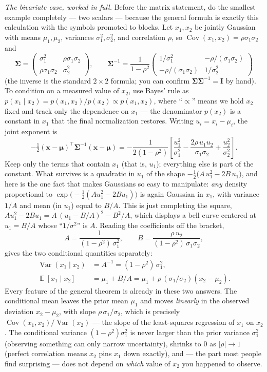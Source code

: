 \documentclass[11pt]{article}
\numberwithin{equation}{section}
\theoremstyle{plain}
\theoremstyle{definition}
\theoremstyle{remark}
\DeclareMathOperator{\E}{\mathbb{E}}
\DeclareMathOperator{\Var}{Var}
\DeclareMathOperator{\Cov}{Cov}
\newcommand{\x}{\bm{x}}
\newcommand{\bmu}{\bm{\mu}}
\newcommand{\bSigma}{\bm{\Sigma}}
\newcommand{\T}{\top}
\begin{document}
\emph{The bivariate case, worked in full.} Before the matrix statement, do the smallest example completely --- two scalars --- because the general formula is exactly this calculation with the symbols promoted to blocks. Let $x_1, x_2$ be jointly Gaussian with means $\mu_1, \mu_2$, variances $\sigma_1^2, \sigma_2^2$, and correlation $\rho$, so $\Cov(x_1, x_2) = \rho\sigma_1\sigma_2$ and
\[
\bSigma = \begin{pmatrix} \sigma_1^2 & \rho\sigma_1\sigma_2 \\ \rho\sigma_1\sigma_2 & \sigma_2^2 \end{pmatrix},
\qquad
\bSigma^{-1} = \frac{1}{1-\rho^2}\begin{pmatrix} 1/\sigma_1^2 & -\rho/(\sigma_1\sigma_2) \\ -\rho/(\sigma_1\sigma_2) & 1/\sigma_2^2 \end{pmatrix}
\]
(the inverse is the standard $2\times 2$ formula; you can confirm $\bSigma\bSigma^{-1} = \bm{I}$ by hand). To condition on a measured value of $x_2$, use Bayes' rule as $p(x_1 \mid x_2) = p(x_1, x_2)/p(x_2) \propto p(x_1, x_2)$, where ``$\propto$'' means we hold $x_2$ fixed and track only the dependence on $x_1$ --- the denominator $p(x_2)$ is a constant in $x_1$ that the final normalization restores. Writing $u_i = x_i - \mu_i$, the joint exponent is
\[
-\tfrac12 (\x - \bmu)^\T \bSigma^{-1} (\x - \bmu)
= -\frac{1}{2(1-\rho^2)}\left[ \frac{u_1^2}{\sigma_1^2} - \frac{2\rho\, u_1 u_2}{\sigma_1\sigma_2} + \frac{u_2^2}{\sigma_2^2} \right].
\]
Keep only the terms that contain $x_1$ (that is, $u_1$); everything else is part of the constant. What survives is a quadratic in $u_1$ of the shape $-\tfrac12\big(A\,u_1^2 - 2B\,u_1\big)$, and here is the one fact that makes Gaussians so easy to manipulate: \emph{any} density proportional to $\exp\!\big(\!-\tfrac12(A u_1^2 - 2B u_1)\big)$ is again Gaussian in $x_1$, with variance $1/A$ and mean (in $u_1$) equal to $B/A$. This is just completing the square, $A u_1^2 - 2B u_1 = A\,(u_1 - B/A)^2 - B^2/A$, which displays a bell curve centered at $u_1 = B/A$ whose ``$1/\sigma^2$'' is $A$. Reading the coefficients off the bracket,
\[
A = \frac{1}{(1-\rho^2)\,\sigma_1^2}, \qquad
B = \frac{\rho\, u_2}{(1-\rho^2)\,\sigma_1\sigma_2},
\]
gives the two conditional quantities separately:
\begin{align*}
\Var(x_1 \mid x_2)
&= A^{-1}
= (1-\rho^2)\,\sigma_1^2,\\
\E[x_1 \mid x_2]
&= \mu_1 + B/A
= \mu_1 + \rho\,(\sigma_1/\sigma_2)(x_2 - \mu_2).
\end{align*}
Every feature of the general theorem is already in these two answers. The conditional mean leaves the prior mean $\mu_1$ and moves \emph{linearly} in the observed deviation $x_2 - \mu_2$, with slope $\rho\,\sigma_1/\sigma_2$, which is precisely $\Cov(x_1, x_2)/\Var(x_2)$ --- the slope of the least-squares regression of $x_1$ on $x_2$. The conditional variance $(1-\rho^2)\sigma_1^2$ is never larger than the prior variance $\sigma_1^2$ (observing something can only narrow uncertainty), shrinks to $0$ as $|\rho| \to 1$ (perfect correlation means $x_2$ pins $x_1$ down exactly), and --- the part most people find surprising --- does not depend on \emph{which} value of $x_2$ you happened to observe.
\end{document}
